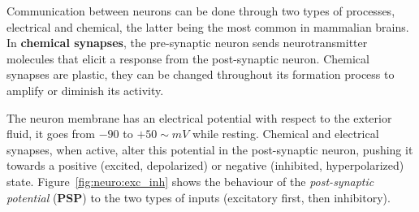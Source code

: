 Communication between neurons can be done through two types of processes, electrical and chemical, the latter being the most common in mammalian brains. In \textbf{chemical synapses}, the pre-synaptic neuron sends neurotransmitter molecules that elicit a response from the post-synaptic neuron. 
Chemical synapses are plastic, they can be changed throughout its formation process to amplify or diminish its activity.


The neuron membrane has an electrical potential with respect to the exterior fluid, it goes from $-90$ to $+50\sim$$mV$ while resting. Chemical and electrical synapses, when active, alter this potential in the post-synaptic neuron, pushing it towards a positive (excited, depolarized) or negative (inhibited, hyperpolarized) state. Figure~\ref{fig:neuro:exc_inh} shows the behaviour of the \emph{post-synaptic potential} (\textbf{PSP}) to the two types of inputs (excitatory first, then inhibitory). 

